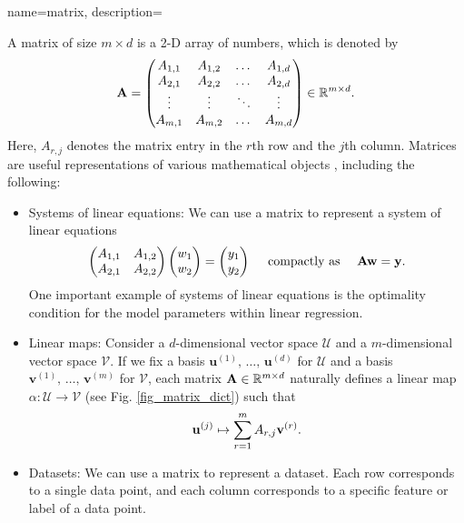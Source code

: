 {name={matrix},
	description={A matrix of size $m \times d$ is a 2-D array of numbers, 
 		which is denoted by 
		$$
  		{\bf A} = \begin{pmatrix}
   		A_{1,1} & A_{1,2} & \dots  & A_{1,d} \\
		A_{2,1} & A_{2,2} & \dots  & A_{2,d} \\
		\vdots  & \vdots  & \ddots & \vdots \\
		A_{m,1} & A_{m,2} & \dots  & A_{m,d}
		\end{pmatrix} \in \mathbb{R}^{m \times d}.
		$$
		Here, $A_{r,j}$ denotes the matrix entry in the $r$th row and the 
		$j$th column. Matrices are useful representations of various mathematical objects \cite{StrangLinAlg2016},
		including the following:
		\begin{itemize}
			\item Systems of linear equations: We can use a matrix to represent a system of linear equations 
			$$ \begin{pmatrix}
			A_{1,1} & A_{1,2} \\
			A_{2,1} & A_{2,2}
			\end{pmatrix}
			\begin{pmatrix}
				w_1 \\
				w_2
			\end{pmatrix}
			=\begin{pmatrix}
				y_1 \\
				y_2
			\end{pmatrix}
			\quad \text{ compactly as } \quad {\bf A} {\bf w} = {\bf y}.
			$$
    			One important example of systems of linear equations is the optimality condition for the 
    			model parameters within linear regression. 
			\item Linear maps:
			Consider a $d$-dimensional vector space $\mathcal{U}$ and a $m$-dimensional vector space $\mathcal{V}$. 
			If we fix a basis $\mathbf{u}^{(1)},\,\ldots,\,\mathbf{u}^{(d)}$ for $\mathcal{U}$ and a basis $\mathbf{v}^{(1)},\,\ldots,\,\mathbf{v}^{(m)}$ 
			for $\mathcal{V}$, each matrix ${\bf A} \in \mathbb{R}^{m \times d}$ naturally defines a 
			linear map $\alpha: \mathcal{U} \rightarrow \mathcal{V}$ (see Fig. \ref{fig_matrix_dict}) such that
   			$${\bf u}^{(j)} \mapsto \sum_{r=1}^{m} A_{r,j} {\bf v}^{(r)}.$$
			\item Datasets: We can use a matrix to represent a dataset. Each row 
			corresponds to a single data point, and each column corresponds to a specific 
			feature or label of a data point. 
		\end{itemize}
		\begin{figure}[H]
		\begin{center}
		\begin{tikzpicture}[x=2cm]
			

\end{tikzpicture}
\end{center}
\end{figure}}}
